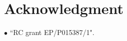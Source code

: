 \documentclass{svproc}
\begin{document}
\section*{Acknowledgment}
$\bullet$ ``RC grant EP/P015387/1".

%
%

%
%

 
\end{document}
